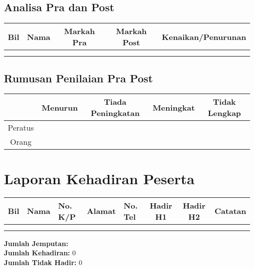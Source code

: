 \documentclass[a4paper,12pt]{article}
\begin{document}
\subsection{Analisa Pra dan Post}
\begin{longtable}{|c|p{6cm}|c|c|c|}
    \hline
    \rowcolor{lightgray}
    \textbf{Bil} & \textbf{Nama} & \textbf{Markah Pra} & \textbf{Markah Post} & \textbf{Kenaikan/Penurunan} \\
    \hline
    \endhead
    
     &  &  &  &  \\
    \hline
    
     &  &  &  &  \\
    \hline
    
\end{longtable}

\subsection{Rumusan Penilaian Pra Post}
\begin{tabular}{|c|c|c|c|c|}
    \hline
    \rowcolor{lightgray}
    \textbf{} & \textbf{Menurun} & \textbf{Tiada Peningkatan} & \textbf{Meningkat} & \textbf{Tidak Lengkap} \\
    \hline
    Peratus &  &  &  &  \\
    \hline
    Orang &  &  &  &  \\
    \hline
\end{tabular}

\section{Laporan Kehadiran Peserta}
\begin{longtable}{|c|p{4cm}|p{3cm}|p{4cm}|p{2cm}|c|c|p{2cm}|}
    \hline
    \rowcolor{lightgray}
    \textbf{Bil} & \textbf{Nama} & \textbf{No. K/P} & \textbf{Alamat} & \textbf{No. Tel} & \textbf{Hadir H1} & \textbf{Hadir H2} & \textbf{Catatan} \\
    \hline
    \endhead
    
     &  &  &  &  &  &  &  \\
    \hline
    
     &  &  &  &  &  &  &  \\
    \hline
    
\end{longtable}

\textbf{Jumlah Jemputan:}  \\
\textbf{Jumlah Kehadiran:} 0 \\
\textbf{Jumlah Tidak Hadir:} 0
\end{document}
